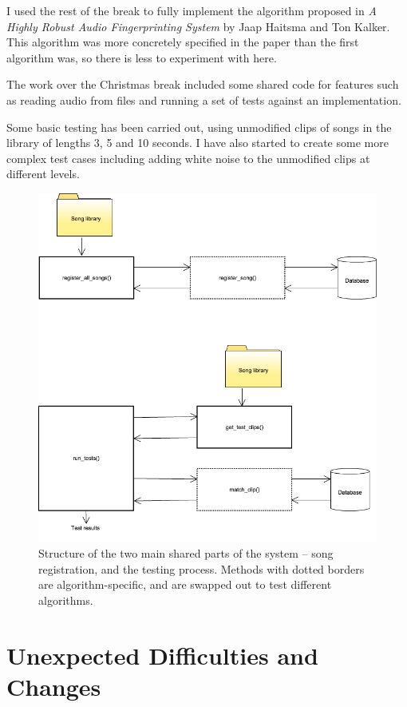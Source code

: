 \documentclass[12pt]{article}
\begin{document}
I used the rest of the break to fully implement the algorithm proposed in \emph{A Highly Robust Audio Fingerprinting System} by Jaap Haitsma and Ton Kalker. This algorithm was more concretely specified in the paper than the first algorithm was, so there is less to experiment with here.

The work over the Christmas break included some shared code for features such as reading audio from files and running a set of tests against an implementation.

Some basic testing has been carried out, using unmodified clips of songs in the library of lengths 3, 5 and 10 seconds. I have also started to create some more complex test cases including adding white noise to the unmodified clips at different levels.

\begin{figure}[htbp]
  \centering
  \includegraphics[width=\linewidth]{architecture}
  \caption{Structure of the two main shared parts of the system -- song registration, and the testing process. Methods with dotted borders are algorithm-specific, and are swapped out to test different algorithms.}
\end{figure}


\newpage


\section*{Unexpected Difficulties and Changes}
\end{document}
